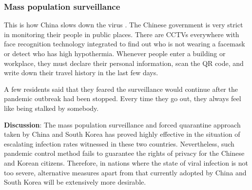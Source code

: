       \subsubsection{Mass population surveillance}
        \par This is how China slows down the virus \parencite{ChinasMeasure1} \parencite{ChinasMeasure2}. The Chinese government is very strict in monitoring their people in public places. There are CCTVs everywhere with face recognition technology integrated to find out who is not wearing a facemask or detect who has high hypothermia. Whenever people enter a building or workplace, they must declare their personal information, scan the QR code, and write down their travel history in the last few days.
        \par A few residents said that they feared the surveillance would continue after the pandemic outbreak had been stopped. Every time they go out, they always feel like being stalked by somebody.
        

        \par \textbf{Discussion}: The mass population surveillance and forced quarantine approach taken by China and South Korea has proved highly effective in the situation of escalating infection rates witnessed in these two countries. Nevertheless, such pandemic control method fails to guarantee the rights of privacy for the Chinese and Korean citizens. Therefore, in nations where the state of viral infection is not too severe, alternative measures apart from that currently adopted by China and South Korea will be extensively more desirable.

